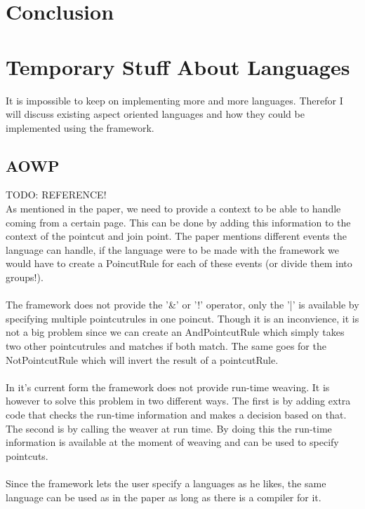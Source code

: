 \documentclass[a4paper]{report}
\begin{document}
\chapter{Conclusion}

\chapter{Temporary Stuff About Languages}
It is impossible to keep on implementing more and more languages. Therefor I will discuss existing aspect oriented languages and how they could be implemented using the framework.
\section{AOWP}


TODO: REFERENCE!\\
As mentioned in the paper, we need to provide a context to be able to handle coming from a certain page. This can be done by adding this information to the context of the pointcut and join point. The paper mentions different events the language can handle, if the language were to be made with the framework we would have to create a PoincutRule for each of these events (or divide them into groups!).\\
\\
The framework does not provide the '\&' or '!' operator, only the '|' is available by specifying multiple pointcutrules in one poincut. Though it is an inconvience, it is not a big problem since we can create an AndPointcutRule which simply takes two other pointcutrules and matches if both match. The same goes for the NotPointcutRule which will invert the result of a pointcutRule.\\
\\
In it's current form the framework does not provide run-time weaving. It is however to solve this problem in two different ways. The first is by adding extra code that checks the run-time information and makes a decision based on that. The second is by calling the weaver at run time.  By doing this the run-time information is available at the moment of weaving and can be used to specify pointcuts.\\
\\
Since the framework lets the user specify a languages as he likes, the same language can be used as in the paper as long as there is a compiler for it.
\end{document}
